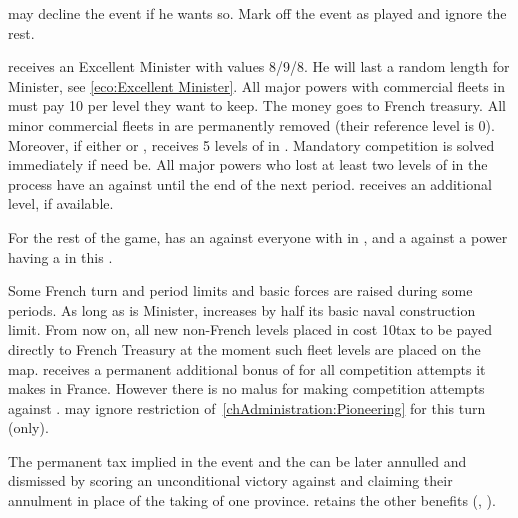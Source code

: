 \condition{}
\aparag \FRA may decline the event if he wants so. Mark off the event as
played and ignore the rest.

\phevnt
\aparag \FRA receives an Excellent Minister  with
values 8/9/8. He will last a random length for Minister, see
\ref{eco:Excellent Minister}.
\aparag All major powers with commercial fleets in  must pay 10
\ducats per level they want to keep. The money goes to French treasury. All
minor commercial fleets in  are permanently removed (their
reference level is 0).
\aparag Moreover, if either \CATHCR or \CATHCO, \FRA receives 5 levels of
\TradeFLEET in .  Mandatory competition is solved immediately if
need be.
\aparag All major powers who lost at least two levels of \TradeFLEET in the
process have an \OCB against \FRA until the end of the next period.
\aparag \FRA receives an additional  \MNU level, if available.

\phdipl
\aparag For the rest of the game, \FRA has an \OCB against everyone with
\TradeFLEET in , and a \CB against a power having a
\TradeFLEET\faceplus in this \CTZ.

\phadm
\aparag\label{pV:Colbert:limits} Some French turn and period limits and basic
forces are raised during some periods.
\aparag As long as \ministreColbert is Minister, \FRA increases by half its
basic naval construction limit.
\aparag From now on, all new non-French \TradeFLEET levels placed in
 cost 10\ducats tax to be payed directly to French Treasury at the
moment such fleet levels are placed on the map.
\aparag\label{pV:Colbert:CB} \FRA receives a permanent additional bonus of
 for all competition attempts it makes in \CTZ France. However there
is no malus for making competition attempts against \FRA.
\aparag \FRA may ignore restriction of~\ref{chAdministration:Pioneering} for
this turn (only).

\phpaix
\aparag The permanent tax implied in the event and the \CB can be later
annulled and \ministreColbert dismissed by scoring an unconditional victory
against \FRA and claiming their annulment in place of the taking of one
province. \FRA retains the other benefits (,
).





